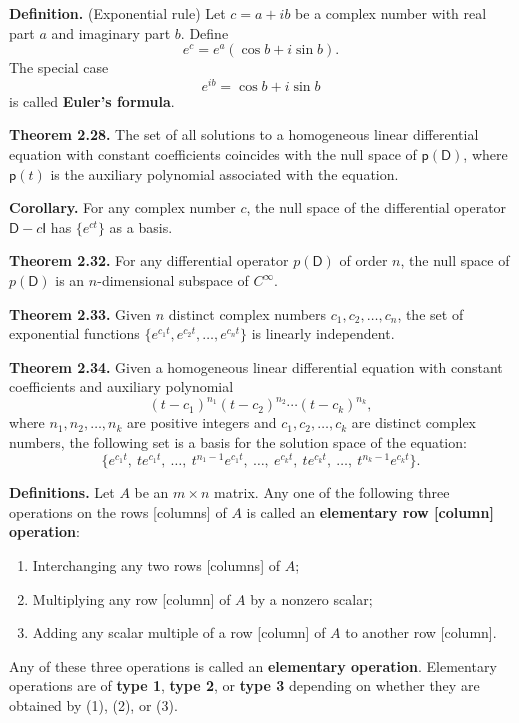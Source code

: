 \documentclass{article}
\newcommand{\0}{\mathit{0}}
\begin{document}
\textbf{Definition.} (Exponential rule) Let $c = a + ib$ be a complex number with real part $a$ and
imaginary part $b$. Define
\[
    e^c = e^a(\cos b + i \sin b).
\]
The special case
\[
    e^{ib} = \cos b + i \sin b
\]
is called \textbf{Euler's formula}.

\textbf{Theorem 2.28.} The set of all solutions to a homogeneous linear differential equation
with constant coefficients coincides with the null space of $\mathsf{p}(\mathsf{D})$,
where $\mathsf{p}(t)$ is the auxiliary polynomial associated with the equation.

\textbf{Corollary.} For any complex number $c$, the null space of the differential operator
$\mathsf{D} - c\mathsf{I}$ has $\{e^{ct}\}$ as a basis.

\textbf{Theorem 2.32.} For any differential operator $p(\mathsf{D})$ of order $n$,
the null space of $p(\mathsf{D})$ is an $n$-dimensional subspace of $C^\infty$.

\textbf{Theorem 2.33.} Given $n$ distinct complex numbers $c_1, c_2, \dots, c_n$,
the set of exponential functions $\{e^{c_1 t}, e^{c_2 t}, \dots, e^{c_n t}\}$ is linearly independent.

\textbf{Theorem 2.34.} Given a homogeneous linear differential equation with
constant coefficients and auxiliary polynomial
\[
    (t - c_1)^{n_1}(t - c_2)^{n_2} \cdots (t - c_k)^{n_k},
\]
where $n_1, n_2, \dots, n_k$ are positive integers and $c_1, c_2, \dots, c_k$ are distinct
complex numbers, the following set is a basis for the solution space of the equation:
\[
    \{e^{c_1 t},\ te^{c_1 t},\ \dots,\ t^{n_1 - 1}e^{c_1 t},\ \dots,\ e^{c_k t},\ te^{c_k t},\ \dots,\ t^{n_k - 1}e^{c_k t}\}.
\]

\medskip

\textbf{Definitions.} Let $A$ be an $m \times n$ matrix. Any one of the following three operations 
on the rows [columns] of $A$ is called an \textbf{elementary row [column] operation}:
\begin{enumerate}
    \item Interchanging any two rows [columns] of $A$;
    \item Multiplying any row [column] of $A$ by a nonzero scalar;
    \item Adding any scalar multiple of a row [column] of $A$ to another row [column].
\end{enumerate}
Any of these three operations is called an \textbf{elementary operation}. Elementary operations 
are of \textbf{type 1}, \textbf{type 2}, or \textbf{type 3} depending on whether they are obtained by (1), (2), or (3).
\end{document}
